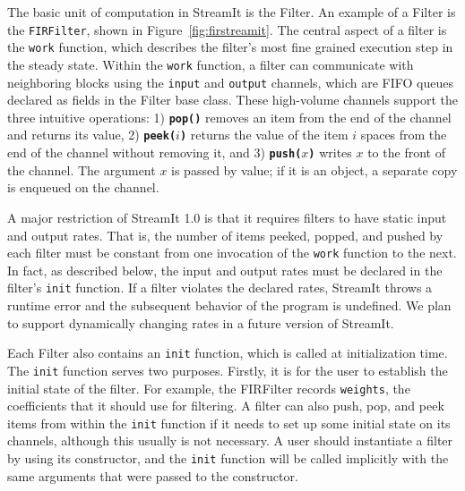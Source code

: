 The basic unit of computation in StreamIt is the Filter.  An example of
a Filter is the {\tt FIRFilter}, shown in Figure~\ref{fig:firstreamit}.  The central
aspect of a filter is the {\tt work} function, which describes the
filter's most fine grained execution step in the steady state.  Within
the {\tt work} function, a filter can communicate with neighboring
blocks using the {\tt input} and {\tt output} channels, which are FIFO
queues declared as fields in the Filter base class.  These high-volume
channels support the three intuitive operations: 1) {\bf {\tt pop()}}
removes an item from the end of the channel and returns its value, 2)
{\bf {\tt peek($i$)}} returns the value of the item $i$ spaces from the
end of the channel without removing it, and 3) {\bf {\tt push($x$)}}
writes $x$ to the front of the channel.  The argument $x$ is passed by
value; if it is an object, a separate copy is enqueued on the channel.

A major restriction of StreamIt 1.0 is that it requires filters to have
static input and output rates.  That is, the number of items peeked,
popped, and pushed by each filter must be constant from one invocation
of the {\tt work} function to the next.  In fact, as described below,
the input and output rates must be declared in the filter's {\tt init}
function.  If a filter violates the declared rates, StreamIt throws a
runtime error and the subsequent behavior of the program is
undefined. We plan to support dynamically changing rates in a future
version of StreamIt.

Each Filter also contains an {\tt init} function, which is called at
initialization time.  The {\tt init} function serves two purposes.
Firstly, it is for the user to establish the initial state of the
filter.  For example, the FIRFilter records {\tt weights}, the
coefficients that it should use for filtering.  A filter can also push,
pop, and peek items from within the {\tt init} function if it needs to
set up some initial state on its channels, although this usually is not
necessary.  A user should instantiate a filter by using its constructor,
and the {\tt init} function will be called implicitly with the same
arguments that were passed to the constructor.


